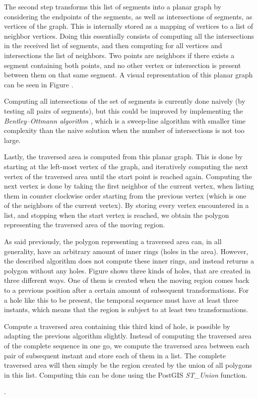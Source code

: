 The second step transforms this list of segments into a planar graph by considering the endpoints of the segments, as well as intersections of segments, as vertices of the graph. This is internally stored as a mapping of vertices to a list of neighbor vertices. Doing this essentially consists of computing all the intersections in the received list of segments, and then computing for all vertices and intersections the list of neighbors. Two points are neighbors if there exists a segment containing both points, and no other vertex or intersection is present between them on that same segment. A visual representation of this planar graph can be seen in Figure .

Computing all intersections of the set of segments is currently done naively (by testing all pairs of segments), but this could be improved by implementing the \textit{Bentley–Ottmann algorithm} \cite{computational_geometry}, which is a sweep-line algorithm with smaller time complexity than the naive solution when the number of intersections is not too large.


Lastly, the traversed area is computed from this planar graph. This is done by starting at the left-most vertex of the graph, and iteratively computing the next vertex of the traversed area until the start point is reached again. Computing the next vertex is done by taking the first neighbor of the current vertex, when listing them in counter clockwise order starting from the previous vertex (which is one of the neighbors of the current vertex). By storing every vertex encountered in a list, and stopping when the start vertex is reached, we obtain the polygon representing the traversed area of the moving region.


As said previously, the polygon representing a traversed area can, in all generality, have an arbitrary amount of inner rings (holes in the area). However, the described algorithm does not compute these inner rings, and instead returns a polygon without any holes. Figure  shows three kinds of holes, that are created in three different ways. One of them is created when the moving region comes back to a previous position after a certain amount of subsequent transformations. For a hole like this to be present, the temporal sequence must have at least three instants, which means that the region is subject to at least two transformations.

Compute a traversed area containing this third kind of hole, is possible by adapting the previous algorithm slightly. Instead of computing the traversed area of the complete sequence in one go, we compute the traversed area between each pair of subsequent instant and store each of them in a list. The complete traversed area will then simply be the region created by the union of all polygons in this list. Computing this can be done using the PostGIS \textit{ST\_Union} function.

.